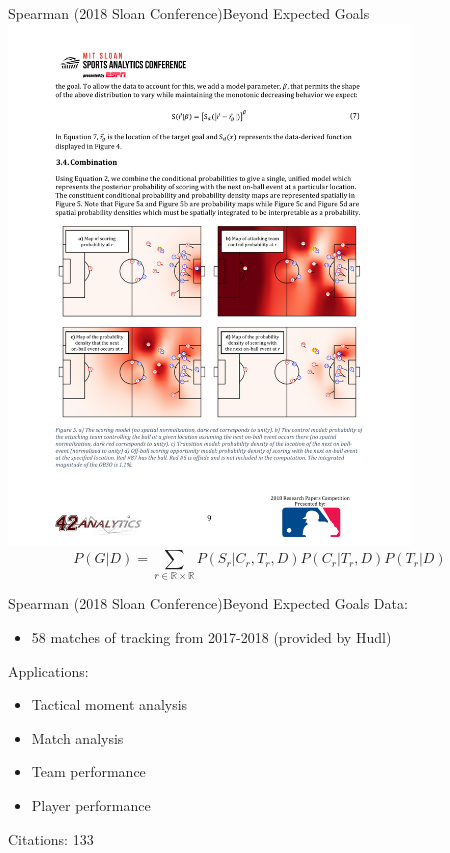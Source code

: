 \documentclass{beamer}
\begin{document}
  \begin{frame}{Spearman (2018 Sloan Conference)}{Beyond Expected Goals}
    \centering
    \includegraphics[width = 0.8\textwidth]{images/spearman_2018.pdf}
    $$
      P(G | D) = \sum_{r \in \mathbb{R}\times\mathbb{R}} P(S_r | C_r, T_r, D) P(C_r | T_r, D) P(T_r | D)
    $$
  \end{frame}

  \begin{frame}{Spearman (2018 Sloan Conference)}{Beyond Expected Goals}
    Data:
    \begin{itemize}
      \item 58 matches of tracking from 2017-2018 (provided by Hudl)
    \end{itemize}
    Applications:
    \begin{itemize}
      \item Tactical moment analysis
      \item Match analysis
      \item Team performance
      \item Player performance
    \end{itemize}
    Citations: 133
  \end{frame}
\end{document}
